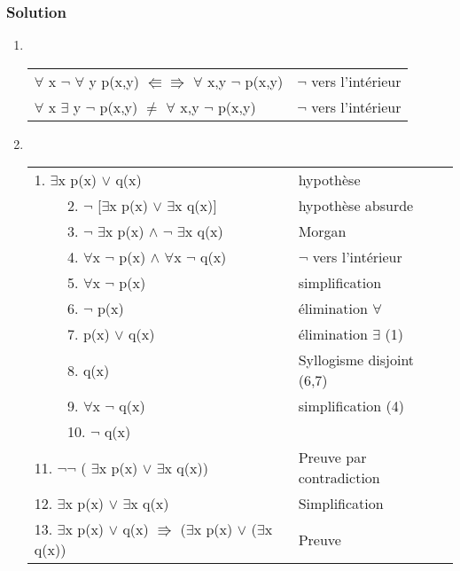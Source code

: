     \subsubsection*{Solution}
  \begin{enumerate}

    \item \hspace{1pt}\\ 
        \begin{tabular}{|l|l|}
        \hline
        $\forall$ x $\neg$ $\forall$ y p(x,y) $\Lleftarrow \Rrightarrow$ $\forall$ x,y $\neg$ p(x,y) & $\neg$ vers l'intérieur\\
        $\forall$ x $\exists$ y $\neg$ p(x,y) $\ne$ $\forall$ x,y $\neg$ p(x,y)& $\neg$ vers l'intérieur\\
        \hline
        \end{tabular}
    
    \item \hspace{1pt}\\
        \begin{tabular}{|l|l|}
        \hline
        1. $\exists$x p(x) $\lor$ q(x) & hypothèse \\
        $\qquad$ 2. $\neg$ [$\exists$x p(x) $\lor$ $\exists$x q(x)] & hypothèse absurde\\
        $\qquad$ 3. $\neg$ $\exists$x p(x) $\land$ $\neg$ $\exists$x q(x) & Morgan\\
        $\qquad$ 4. $\forall$x $\neg$ p(x) $\land$ $\forall$x $\neg$ q(x) & $\neg$ vers l'intérieur\\
        $\qquad$ 5. $\forall$x $\neg$ p(x) & simplification\\
        $\qquad$ 6. $\neg$ p(x) & élimination $\forall$\\
        $\qquad$ 7. p(x) $\lor$ q(x) & élimination $\exists$ (1)\\
        $\qquad$ 8. q(x) & Syllogisme disjoint (6,7)\\
        $\qquad$ 9. $\forall$x $\neg$ q(x) & simplification (4)\\
        $\qquad$ 10. $\neg$ q(x) & \\
        11. $\neg \neg$ ( $\exists$x p(x) $\lor$ $\exists$x q(x)) & Preuve par contradiction\\
        12. $\exists$x p(x) $\lor$ $\exists$x q(x)& Simplification\\
        13. $\exists$x p(x) $\lor$ q(x) $\Rrightarrow$ ($\exists$x p(x) $\lor$ ($\exists$x q(x)) & Preuve\\
        \hline
        \end{tabular}
        

\end{enumerate}
